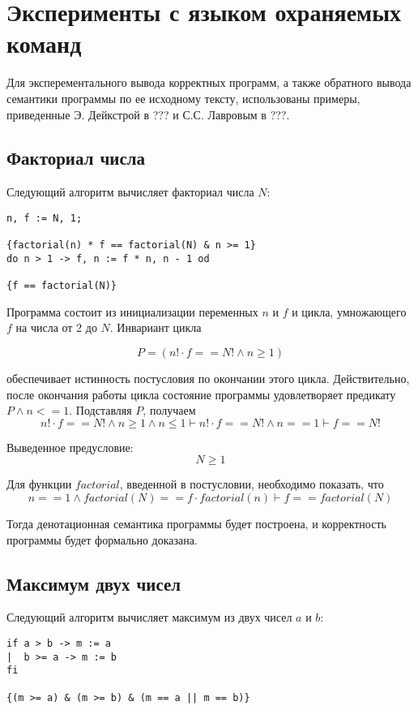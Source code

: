\chapter{Эксперименты с языком охраняемых команд} \label{ch4}

Для эксперементального вывода корректных программ, а также обратного вывода семантики программы
по ее исходному тексту, использованы примеры, приведенные Э. Дейкстрой в ??? и С.С. Лавровым в ???.

\section{Факториал числа}
Следующий алгоритм вычисляет факториал числа $N$:
\begin{verbatim}
n, f := N, 1;

{factorial(n) * f == factorial(N) & n >= 1}
do n > 1 -> f, n := f * n, n - 1 od

{f == factorial(N)}
\end{verbatim}

Программа состоит из инициализации переменных $n$ и $f$ и цикла,
умножающего $f$ на числа от 2 до $N$. Инвариант цикла

\begin{equation}
    P = \left( n! \cdot f == N! \wedge n \geq 1 \right)
\end{equation}

обеспечивает истинность постусловия по окончании этого цикла. Действительно,
после окончания работы цикла состояние программы удовлетворяет предикату $P \wedge n <= 1$. Подставляя $P$, получаем
\begin{equation}
n! \cdot f == N! \wedge n \geq 1 \wedge n \leq 1  \vdash n! \cdot f == N! \wedge n == 1 \vdash f == N!
\end{equation}

Выведенное предусловие: 
\begin{equation}
    N \geq 1
\end{equation}

Для функции $factorial$, введенной в постусловии, необходимо показать, что
\begin{equation}
    n == 1 \wedge factorial(N) == f \cdot factorial(n) \vdash f == factorial(N)
\end{equation}

Тогда денотационная семантика программы будет построена, и корректность программы
будет формально доказана.

\section{Максимум двух чисел}
Следующий алгоритм вычисляет максимум из двух чисел $a$ и $b$:
\begin{BVerbatim}
if a > b -> m := a
|  b >= a -> m := b
fi

{(m >= a) & (m >= b) & (m == a || m == b)}
\end{BVerbatim}

